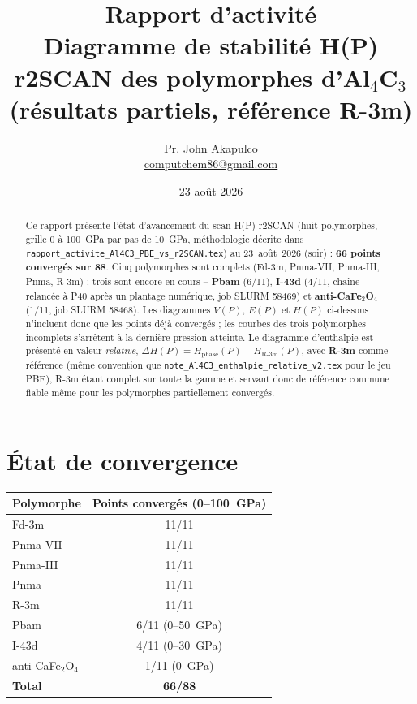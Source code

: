 \documentclass[11pt,a4paper]{article}
\title{\vspace{-1.5cm}Rapport d'activité\\[2pt]
\large Diagramme de stabilité H(P) r2SCAN des polymorphes d'Al$_4$C$_3$\\[2pt]
\normalsize (résultats partiels, référence R-3m)}
\author{Pr. John Akapulco \\ \small \href{mailto:computchem86@gmail.com}{computchem86@gmail.com}}
\date{23 août 2026}
\begin{document}
\maketitle
\vspace{-0.5cm}

\begin{abstract}
\noindent
Ce rapport présente l'état d'avancement du scan H(P) r2SCAN (huit polymorphes, grille 0 à
100~GPa par pas de 10~GPa, méthodologie décrite dans
\texttt{rapport\_activite\_Al4C3\_PBE\_vs\_r2SCAN.tex}) au 23~août~2026 (soir) :
\textbf{66 points convergés sur 88}. Cinq polymorphes sont complets (Fd-3m, Pnma-VII,
Pnma-III, Pnma, R-3m) ; trois sont encore en cours -- \textbf{Pbam} (6/11), \textbf{I-43d}
(4/11, chaîne relancée à P40 après un plantage numérique, job SLURM 58469) et
\textbf{anti-CaFe$_2$O$_4$} (1/11, job SLURM 58468). Les diagrammes $V(P)$, $E(P)$ et $H(P)$
ci-dessous n'incluent donc que les points déjà convergés ; les courbes des trois polymorphes
incomplets s'arrêtent à la dernière pression atteinte. Le diagramme d'enthalpie est présenté en
valeur \emph{relative}, $\Delta H(P) = H_{\text{phase}}(P) - H_{\text{R-3m}}(P)$, avec
\textbf{R-3m} comme référence (même convention que
\texttt{note\_Al4C3\_enthalpie\_relative\_v2.tex} pour le jeu PBE), R-3m étant complet sur toute
la gamme et servant donc de référence commune fiable même pour les polymorphes partiellement
convergés.
\end{abstract}

\section{État de convergence}

\begin{center}
\begin{tabular}{lc}
\toprule
Polymorphe & Points convergés (0--100~GPa) \\
\midrule
Fd-3m              & 11/11 \\
Pnma-VII           & 11/11 \\
Pnma-III           & 11/11 \\
Pnma               & 11/11 \\
R-3m               & 11/11 \\
Pbam               & 6/11 (0--50~GPa) \\
I-43d              & 4/11 (0--30~GPa) \\
anti-CaFe$_2$O$_4$ & 1/11 (0~GPa) \\
\midrule
\textbf{Total} & \textbf{66/88} \\
\bottomrule
\end{tabular}
\label{tab:r2scan_conv}
\end{center}
\end{document}
